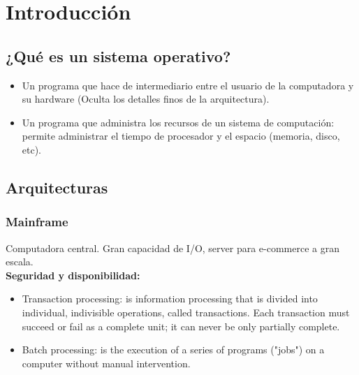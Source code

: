 \documentclass[a4paper, twoside]{article}
\newcommand{\rutapaquetes}{./paquetes-apunte}
\begin{document}
\maketitle %

\tableofcontents %



\section{Introducción}
\subsection{¿Qué es un sistema operativo?}
\begin{itemize}
	\item Un programa que hace de intermediario entre el usuario de la computadora y su hardware (Oculta los detalles finos de la arquitectura).
	\item Un programa que administra los recursos de un sistema de computación: permite administrar el tiempo de procesador y el espacio (memoria, disco, etc).
\end{itemize}

\subsection{Arquitecturas}
\subsubsection{Mainframe}
Computadora central. Gran capacidad de I/O, server para e-commerce a gran escala.\\

\textbf{Seguridad y disponibilidad:} 
\begin{itemize}
	\item Transaction processing: is information processing that is divided into individual, indivisible operations, called transactions. Each transaction must succeed or fail as a complete unit; it can never be only partially complete.
	\item Batch processing: is the execution of a series of programs ("jobs") on a computer without manual intervention.
\end{itemize}
\end{document}
